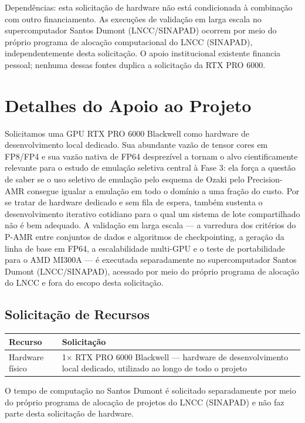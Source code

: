 \documentclass[12pt,a4paper]{article}
\newcommand{\pamr}{P\nobreakdash-AMR}
\begin{document}
Dependências: esta solicitação de hardware não está condicionada à combinação
com outro financiamento. As execuções de validação em larga escala no
supercomputador Santos Dumont (LNCC/SINAPAD) ocorrem por meio do próprio
programa de alocação computacional do LNCC (SINAPAD), independentemente desta
solicitação. O apoio institucional existente financia pessoal; nenhuma dessas
fontes duplica a solicitação da RTX PRO 6000.

\section{Detalhes do Apoio ao Projeto}

Solicitamos uma GPU RTX PRO 6000 Blackwell como hardware de desenvolvimento
local dedicado. Sua abundante vazão de tensor cores em FP8/FP4 e sua vazão
nativa de FP64 desprezível a tornam o alvo cientificamente relevante para o
estudo de emulação seletiva central à Fase 3: ela força a questão de saber se
o uso seletivo de emulação pelo esquema de Ozaki pelo Precision-AMR consegue
igualar a emulação em todo o domínio a uma fração do custo. Por se tratar de
hardware dedicado e sem fila de espera, também sustenta o desenvolvimento
iterativo cotidiano para o qual um sistema de lote compartilhado não é bem
adequado. A validação em larga escala --- a varredura dos critérios do \pamr{}
entre conjuntos de dados e algoritmos de checkpointing, a geração da linha de
base em FP64, a escalabilidade multi-GPU e o teste de portabilidade para o AMD
MI300A --- é executada separadamente no supercomputador Santos Dumont
(LNCC/SINAPAD), acessado por meio do próprio programa de alocação do LNCC e
fora do escopo desta solicitação.

\subsection*{Solicitação de Recursos}

\begin{longtable}{@{}p{}p{}@{}}
\toprule
\textbf{Recurso} & \textbf{Solicitação}\\
\midrule
\endhead
\bottomrule
\endfoot
Hardware físico & 1$\times$ RTX PRO 6000 Blackwell --- hardware de
desenvolvimento local dedicado, utilizado ao longo de todo o projeto\\
\end{longtable}

O tempo de computação no Santos Dumont é solicitado separadamente por meio do
próprio programa de alocação de projetos do LNCC (SINAPAD) e não faz parte
desta solicitação de hardware.



\end{document}
